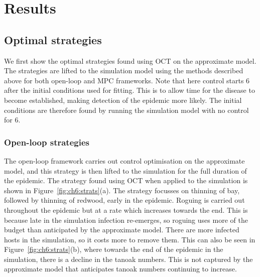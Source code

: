 \section{Results\label{sec:ch6:results}}

\subsection{Optimal strategies}

We first show the optimal strategies found using OCT on the approximate model. The strategies are lifted to the simulation model using the methods described above for both open-loop and MPC frameworks. Note that here control starts \SI{6}{\years} after the initial conditions used for fitting. This is to allow time for the disease to become established, making detection of the epidemic more likely. The initial conditions are therefore found by running the simulation model with no control for \SI{6}{\years}.

\subsubsection{Open-loop strategies}\label{sec:ch6:open_loop}

The open-loop framework carries out control optimisation on the approximate model, and this strategy is then lifted to the simulation for the full duration of the epidemic. The strategy found using OCT when applied to the simulation is shown in Figure~\ref{fig:ch6:strats}(a). The strategy focusses on thinning of bay, followed by thinning of redwood, early in the epidemic. Roguing is carried out throughout the epidemic but at a rate which increases towards the end. This is because late in the simulation infection re-emerges, so roguing uses more of the budget than anticipated by the approximate model. There are more infected hosts in the simulation, so it costs more to remove them. This can also be seen in Figure~\ref{fig:ch6:strats}(b), where towards the end of the epidemic in the simulation, there is a decline in the tanoak numbers. This is not captured by the approximate model that anticipates tanoak numbers continuing to increase.


